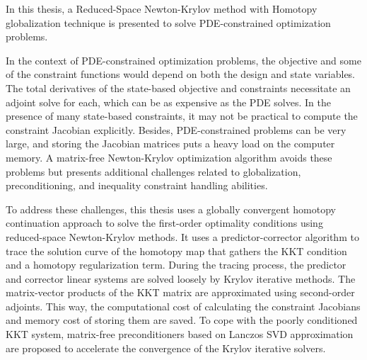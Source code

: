  
 In this thesis, a Reduced-Space Newton-Krylov method with Homotopy globalization technique is presented to solve PDE-constrained optimization problems.  
 
In the context of PDE-constrained optimization problems, 
the objective and some of the constraint functions would depend on both the design and state variables. The  
total derivatives of the state-based objective and constraints necessitate an adjoint solve for each, which can be as expensive as the PDE solves. In the presence of many state-based constraints, it may not be practical to compute the constraint Jacobian explicitly. Besides, PDE-constrained problems can be very large, and 
 storing the Jacobian matrices puts a heavy load on the computer memory.  A matrix-free Newton-Krylov optimization algorithm avoids these problems but presents additional challenges related to globalization, preconditioning, and inequality constraint handling abilities. 

To address these challenges, this thesis uses a globally convergent homotopy continuation approach to solve the first-order optimality conditions using reduced-space Newton-Krylov methods. It uses a predictor-corrector algorithm to trace the solution curve of the homotopy map that gathers the KKT condition and a homotopy regularization term. During the tracing process, the predictor and corrector linear systems are solved loosely by Krylov iterative methods. The matrix-vector products of the KKT matrix are approximated using second-order adjoints. This way, the computational cost of calculating the constraint Jacobians and memory cost of storing them are saved.  To cope with the poorly conditioned KKT system, matrix-free preconditioners based on Lanczos SVD approximation are proposed to accelerate the convergence of the Krylov iterative solvers.  

